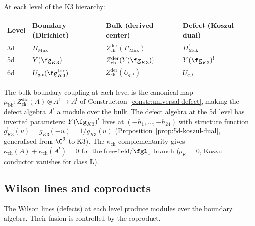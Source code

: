 \begin{construction}
\label{constr:k3-boundary-defect}
At each level of the K3 hierarchy:
\begin{center}
\small
\renewcommand{\arraystretch}{1.3}
\begin{tabular}{llll}
\toprule
\textbf{Level} & \textbf{Boundary (Dirichlet)} & \textbf{Bulk (derived center)} & \textbf{Defect (Koszul dual)} \\
\midrule
3d & $H_{\mathrm{Muk}}$ & $Z^{\mathrm{der}}_{\mathrm{ch}}(H_{\mathrm{Muk}})$ & $H_{\mathrm{Muk}}^!$ \\
5d & $Y(\fg_{K3})$ & $Z^{\mathrm{der}}_{\mathrm{ch}}(Y(\fg_{K3}))$ & $Y(\fg_{K3})^!$ \\
6d & $U_{q,t}(\fg_{K3}^{\mathrm{tor}})$ & $Z^{\mathrm{der}}_{\mathrm{ch}}(U_{q,t})$ & $U_{q,t}^!$ \\
\bottomrule
\end{tabular}
\end{center}
The bulk-boundary coupling at each level is the canonical map $\mu_{\mathrm{bb}} \colon Z^{\mathrm{der}}_{\mathrm{ch}}(A) \otimes A^! \to A^!$ of Construction~\ref{constr:universal-defect}, making the defect algebra $A^!$ a module over the bulk. The defect algebra at the 5d level has inverted parameters: $Y(\fg_{K3})^!$ lives at $(-h_1, \ldots, -h_{24})$ with structure function $g_{K3}^!(u) = g_{K3}(-u) = 1/g_{K3}(u)$ (Proposition~\ref{prop:5d-koszul-dual}, generalised from $\C^3$ to K3). The $\kappa_{\mathrm{ch}}$-complementarity gives $\kappa_{\mathrm{ch}}(A) + \kappa_{\mathrm{ch}}(A^!) = 0$ for the free-field/$\fgl_1$ branch ($\rho_K = 0$; Koszul conductor vanishes for class $\mathbf{L}$).
\end{construction}

\subsection{Wilson lines and coproducts}
\label{subsec:k3-wilson-lines}

The Wilson lines (defects) at each level produce modules over the boundary algebra. Their fusion is controlled by the coproduct.

